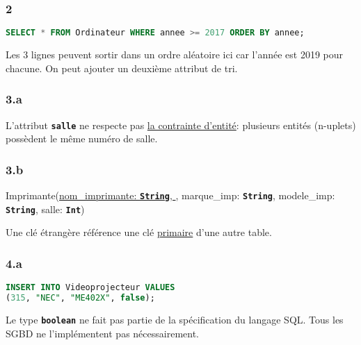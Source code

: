 \documentclass[svgnames,11pt]{beamer}
\begin{document}
\begin{frame}[fragile]
    \frametitle{2}

    \begin{center}
        \begin{lstlisting}[language=SQL , basicstyle=\ttfamily\small, xleftmargin=2em, xrightmargin=0em]
SELECT * FROM Ordinateur WHERE annee >= 2017 ORDER BY annee;
\end{lstlisting}
    \end{center}
\begin{aretenir}[Remarque]
Les 3 lignes peuvent sortir dans un ordre aléatoire ici car l'année est 2019 pour chacune. On peut ajouter un deuxième attribut de tri.
\end{aretenir}
\end{frame}
\begin{frame}
    \frametitle{3.a}

    L'attribut \textbf{\texttt{salle}} ne respecte pas \underline{la contrainte d'entité}: plusieurs entités (n-uplets) possèdent le même numéro de salle.

\end{frame}
\begin{frame}
    \frametitle{3.b}

    Imprimante(\underline{nom\_imprimante: \textbf{\texttt{String}}, }, marque\_imp: \textbf{\texttt{String}}, modele\_imp: \textbf{\texttt{String}}, salle: \textbf{\texttt{Int}})
\begin{aretenir}[]
Une clé étrangère référence une clé \underline{primaire} d'une autre table.
\end{aretenir}
\end{frame}
\begin{frame}[fragile]
    \frametitle{4.a}

    \begin{center}
        \begin{lstlisting}[language=SQL , basicstyle=\ttfamily\small, xleftmargin=2em, xrightmargin=0em]
INSERT INTO Videoprojecteur VALUES
(315, "NEC", "ME402X", false);
\end{lstlisting}
    \end{center}
\begin{aretenir}[Remarque]
Le type \textbf{\texttt{boolean}} ne fait pas partie de la spécification du langage SQL. Tous les SGBD ne l'implémentent pas nécessairement.
\end{aretenir}
\end{frame}
\end{document}
